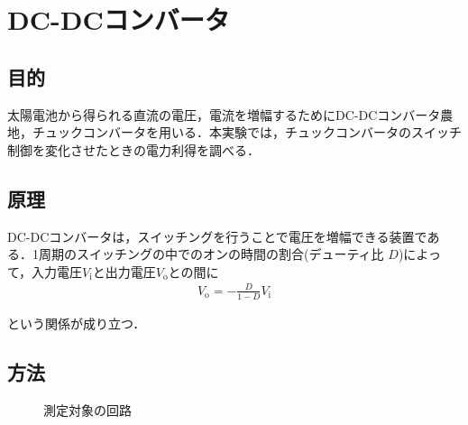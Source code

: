 \documentclass[1_power_supply.tex]{subfiles}
\begin{document}
\section{DC-DCコンバータ}

\subsection{目的}

太陽電池から得られる直流の電圧，電流を増幅するためにDC-DCコンバータ農地，チュックコンバータを用いる．本実験では，チュックコンバータのスイッチ制御を変化させたときの電力利得を調べる．

\subsection{原理}

DC-DCコンバータは，スイッチングを行うことで電圧を増幅できる装置である．1周期のスイッチングの中でのオンの時間の割合(デューティ比 $D$)によって，入力電圧$V_\mathrm{i}$と出力電圧$V_\mathrm{o}$との間に
\begin{align}
	V_\mathrm{o} = -\frac{D}{1-D}V_\mathrm{i}
\end{align}

という関係が成り立つ．

\subsection{方法}

\begin{figure}[htbp]
	\begin{center}
		\caption{測定対象の回路}\label{fig:1_4}
	\end{center}
\end{figure}
\end{document}
